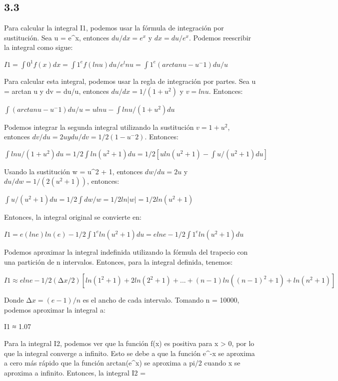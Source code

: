 \documentclass[12pt]{article}
\begin{document}
    \subsection{3.3}

    Para calcular la integral I1, podemos usar la fórmula de integración por sustitución. Sea u = e^x, entonces $du/dx = e^x$ y $dx = du/e^x$. Podemos reescribir la integral como sigue:

    $I1 = ∫0^1 f(x) dx = ∫1^e f(ln u) du/e^ln u = ∫1^e (arctan u - u^-1) du/u$
    
    Para calcular esta integral, podemos usar la regla de integración por partes. Sea u = arctan u y dv = du/u, entonces $du/dx = 1/(1+u^2)$ y $v = ln u$. Entonces:
    
    $∫(arctan u - u^-1) du/u = u ln u - ∫ln u/(1 + u^2) du$
    
    Podemos integrar la segunda integral utilizando la sustitución $v = 1 + u^2$, entonces $dv/du = 2u y du/dv = 1/2(1 - u^-2)$. Entonces:
    
    $∫ln u/(1 + u^2) du = 1/2 ∫ln(u^2 + 1) du = 1/2[u ln(u^2 + 1) - ∫u/(u^2 + 1) du]$
    
    Usando la sustitución w = u^2 + 1, entonces $dw/du = 2u$ y $du/dw = 1/(2(u^2 + 1))$, entonces:
    
    $∫u/(u^2 + 1) du = 1/2 ∫dw/w = 1/2 ln|w| = 1/2 ln(u^2 + 1)$
    
    Entonces, la integral original se convierte en:
    
    $I1 = e(ln e) ln(e) - 1/2 ∫1^e ln(u^2 + 1) du = e ln e - 1/2 ∫1^e ln(u^2 + 1) du$
    
    Podemos aproximar la integral indefinida utilizando la fórmula del trapecio con una partición de n intervalos. Entonces, para la integral definida, tenemos:
    
    $I1 ≈ e ln e - 1/2 (∆x/2)[ln(1^2+1) + 2ln(2^2+1) + ... + (n-1)ln((n-1)^2+1) + ln(n^2+1)]$
    
    Donde $∆x = (e-1)/n$ es el ancho de cada intervalo. Tomando n = 10000, podemos aproximar la integral a:
    
    I1 ≈ 1.07
    
    Para la integral I2, podemos ver que la función f(x) es positiva para x > 0, por lo que la integral converge a infinito. Esto se debe a que la función e^-x se aproxima a cero más rápido que la función arctan(e^x) se aproxima a pi/2 cuando x se aproxima a infinito. Entonces, la integral I2 = \infty
\end{document}
